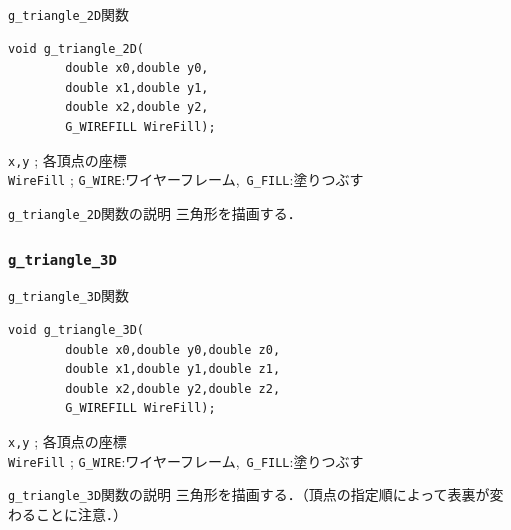 \documentclass[a4paper,12pt]{jsarticle}%
\begin{document}
\begin{itembox}[l]{\texttt{g\_triangle\_2D}関数}
\begin{verbatim}
void g_triangle_2D(        
        double x0,double y0,
        double x1,double y1,
        double x2,double y2,
        G_WIREFILL WireFill);    
\end{verbatim}
\verb|x,y| ; 各頂点の座標\\
\verb|WireFill| ; \verb|G_WIRE|:ワイヤーフレーム,\ \verb|G_FILL|:塗りつぶす \\
\end{itembox}

\begin{itembox}[l]{\texttt{g\_triangle\_2D}関数の説明}
三角形を描画する．
\end{itembox}

\begin{figure}[htb]
\end{figure}




\clearpage
\subsubsection{\texttt{g\_triangle\_3D}}

\begin{itembox}[l]{\texttt{g\_triangle\_3D}関数}
\begin{verbatim}
void g_triangle_3D(
        double x0,double y0,double z0,
        double x1,double y1,double z1,
        double x2,double y2,double z2,
        G_WIREFILL WireFill);    
\end{verbatim}
\verb|x,y| ; 各頂点の座標\\
\verb|WireFill| ; \verb|G_WIRE|:ワイヤーフレーム,\ \verb|G_FILL|:塗りつぶす \\
\end{itembox}

\begin{itembox}[l]{\texttt{g\_triangle\_3D}関数の説明}
三角形を描画する．（頂点の指定順によって表裏が変わることに注意．）
\end{itembox}
\end{document}
